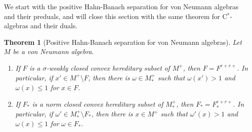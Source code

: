 \documentclass[a4paper]{amsart}
\theoremstyle{plain}
\newtheorem{thm}{Theorem}[section]
\theoremstyle{definition}
\begin{document}
We start with the positive Hahn-Banach separation for von Neumann algebras and their preduals, and will close this section with the same theorem for C$^*$-algebras and their duals.


\begin{thm}[Positive Hahn-Banach separation for von Neumann algebras]\label{positive hahn-banach w*}
Let $M$ be a von Neumann algebra.
\begin{enumerate}
\item If $F$ is a $\sigma$-weakly closed convex hereditary subset of $M^+$, then $F=F^{r+r+}$. In particular, if $x'\in M^+\setminus F$, then there is $\omega\in M_*^+$ such that $\omega(x')>1$ and $\omega(x)\le1$ for $x\in F$.
\item If $F_*$ is a norm closed convex hereditary subset of $M_*^+$, then $F_*=F_*^{r+r+}$. In particular, if $\omega'\in M_*^+\setminus F_*$, then there is $x\in M^+$ such that $\omega'(x)>1$ and $\omega(x)\le1$ for $\omega\in F_*$.
\end{enumerate}
\end{thm}
\end{document}
